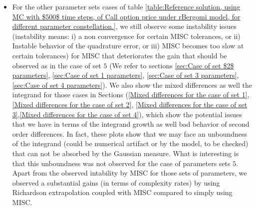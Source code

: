 \documentclass[11pt]{article}
\begin{document}
\begin{itemize}
	\item For the other parameter sets cases of table \ref{table:Reference solution, using MC with $500$ time steps, of Call option price under rBergomi model, for different parameter constellation.}, we still observe some instability issues (instability means: i) a non convergence for certain MISC tolerances, or  ii) Instable behavior of the quadrature error, or  iii) MISC becomes too slow  at certain tolerances) for MISC that deteriorates the gain that should be observed as in the case of set $5$ (We refer to sections \ref{sec:Case of set $2$ parameters}, \ref{sec:Case of set 1 parameters}, \ref{sec:Case of set 3 parameters},\ref{sec:Case of set 4 parameters}).  We also show the mixed differences as well the integrand for those cases in Sections (\ref{Mixed differences for the case of set 1}, \ref{Mixed differences for the case of set 2}, \ref{Mixed differences for the case of set 3},\ref{Mixed differences for the case of set 4}), which show the potential issues that we have in terms of the integrand growth as well bad behavior of second order differences. In fact, these plots show that we may face an unboundness of the integrand (could be numerical artifact or by the model, to be checked) that can not be absorbed by the Gaussian measure. What is interesting is that this unboundness was not observed for the case of parameters sets $5$. Apart from the observed intability by MISC for those sets of parameters, we observed a substantial gains (in terms of  complexity rates) by using Richardson extrapolation coupled with MISC compared to  simply using MISC.
	
\end{itemize}


\end{document}

